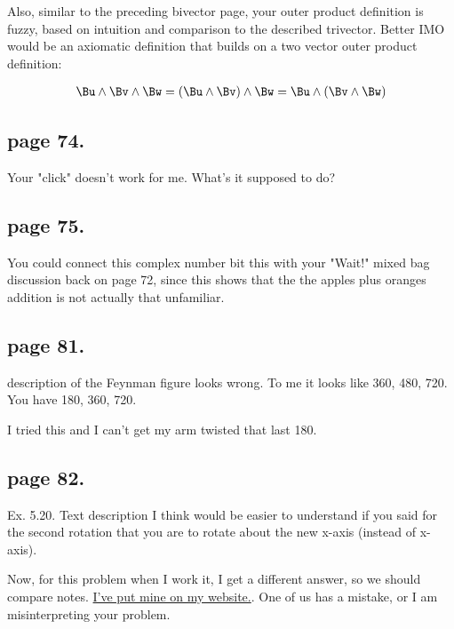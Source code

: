 Also, similar to the preceding bivector page, your outer product definition is 
fuzzy, based on intuition and comparison to the described trivector.  Better
IMO would be an axiomatic definition that builds on a two vector outer product definition:

\begin{align*}
\Bu \wedge \Bv \wedge \Bw &= (\Bu \wedge \Bv) \wedge \Bw = \Bu \wedge (\Bv \wedge \Bw) \\
\end{align*}

\subsection{page 74.}

Your "click" doesn't work for me. What's it supposed to do?

\subsection{page 75. }

You could connect this complex number bit this with your "Wait!" mixed bag discussion back on page 72, since this
shows that the the apples plus oranges addition is not actually that unfamiliar.

\subsection{page 81. }

description of the Feynman figure looks wrong.  To me it looks like 360, 480, 720.  You have 180, 360, 720.

I tried this and I can't get my arm twisted that last 180.

\subsection{page 82. } 

Ex. 5.20.  Text description I think would be easier to understand if you said for the second rotation that you are to
rotate about the new x-axis (instead of x-axis).

Now, for this problem when I work it, I get a different answer, so we should
compare notes.  \href{http://sites.google.com/site/peeterjoot/math2009/two_ninety_rotations.pdf}{I've put mine on my website.}.  One of us has a mistake, or I am misinterpreting your problem.


%
%

%
